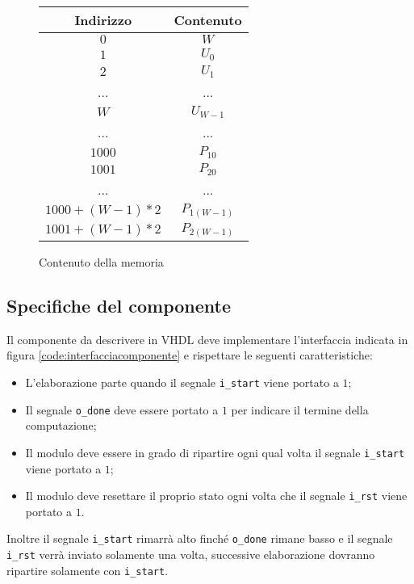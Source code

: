 \begin{figure}[!ht]
    \centering
    \begin{tabular}{c | c}
        Indirizzo          & Contenuto    \\
        \hline
        $0$                & $W$          \\
        $1$                & $U_0$        \\
        $2$                & $U_1$        \\
        ...                & ...          \\
        $W$                & $U_{W-1}$    \\
        ...                & ...          \\
        $1000$             & $P_{10}$     \\
        $1001$             & $P_{20}$     \\
        ...                & ...          \\
        $1000 + (W-1) * 2$ & $P_{1(W-1)}$ \\
        $1001 + (W-1) * 2$ & $P_{2(W-1)}$ \\
    \end{tabular}
    \caption{Contenuto della memoria}
    \label{table:memoria}
\end{figure}

\subsection{Specifiche del componente}

Il componente da descrivere in VHDL deve implementare l'interfaccia indicata in figura \ref{code:interfacciacomponente} e rispettare le seguenti caratteristiche:

\begin{itemize}
    \item L'elaborazione parte quando il segnale \verb|i_start| viene portato a $1$;
    \item Il segnale \verb|o_done| deve essere portato a $1$ per indicare il termine della computazione;
    \item Il modulo deve essere in grado di ripartire ogni qual volta il segnale \verb|i_start| viene portato a $1$;
    \item Il modulo deve resettare il proprio stato ogni volta che il segnale \verb|i_rst| viene portato a $1$.
\end{itemize}

Inoltre il segnale \verb|i_start| rimarrà alto finché \verb|o_done| rimane basso e il segnale \verb|i_rst| verrà inviato solamente una volta, successive elaborazione dovranno ripartire solamente con \verb|i_start|.

